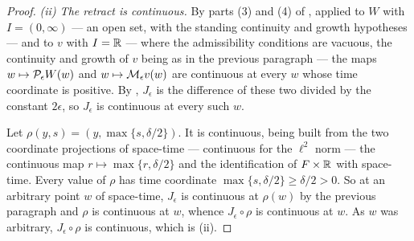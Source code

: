 \begin{proof}
\emph{(ii) The retract is continuous.} By parts (3) and (4) of
, applied to $W$ with $I=(0,\infty)$ --- an open set,
with the standing continuity and growth hypotheses --- and to $v$ with $I=\mathbb{R}$
--- where the admissibility conditions are vacuous, the continuity and growth
of $v$ being as in the previous paragraph --- the maps
$w\mapsto\mathcal{P}_\epsilon W(w)$ and $w\mapsto\mathcal{M}_\epsilon v(w)$ are continuous
at every $w$ whose time coordinate is positive. By , $J_\epsilon$
is the difference of these two divided by the constant $2\epsilon$, so
$J_\epsilon$ is continuous at every such $w$.

Let $\rho(y,s)=(y,\max\{s,\delta/2\})$. It is continuous, being built from the
two coordinate projections of space-time --- continuous for the $\ell^2$ norm
--- the continuous map $r\mapsto\max\{r,\delta/2\}$ and the identification of
$F\times\mathbb{R}$ with space-time. Every value of $\rho$ has time coordinate
$\max\{s,\delta/2\}\ge\delta/2>0$. So at an arbitrary point $w$ of space-time,
$J_\epsilon$ is continuous at $\rho(w)$ by the previous paragraph and $\rho$ is
continuous at $w$, whence $J_\epsilon\circ\rho$ is continuous at $w$. As $w$ was
arbitrary, $J_\epsilon\circ\rho$ is continuous, which is (ii).
\end{proof}
